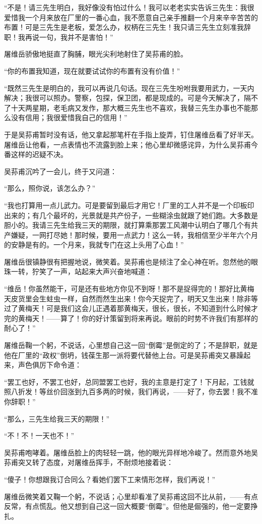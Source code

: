\par “不是！请三先生明白，我好像没有怕过什么！我可以老老实实告诉三先生：我很爱惜我一个月来放在厂里的一番心血，我不愿意自己亲手推翻一个月来辛辛苦苦的布置！可是三先生是老板，爱怎么办，权柄在三先生！我只请三先生立刻准我辞职！我再说一句，我并不是害怕！”
\par 屠维岳骄傲地挺直了胸脯，眼光尖利地射住了吴荪甫的脸。
\par “你的布置我知道，现在就要试试你的布置有没有价值！”
\par “既然三先生是明白的，我可以再说几句话。现在三先生吩咐我要用武力，一天内解决；我很可以照办。警察，包探，保卫团，都是现成的。可是今天解决了，隔不了十天两星期，老毛病又发作，那大概三先生也不喜欢，我替三先生办事也不能那么没有信用；我很爱惜我自己的信用！”
\par 于是吴荪甫暂时没有话，他又拿起那笔杆在手指上旋弄，钉住屠维岳看了好半天。屠维岳让他看，一点表情也不流露到脸上来；他心里却微感诧异，为什么吴荪甫今番这样的迟疑不决。
\par 吴荪甫沉吟了一会儿，终于又问道：
\par “那么，照你说，该怎么办？”
\par “我也打算用一点儿武力。可是要留到最后才用它！厂里的工人并不是一个印板印出来的；有几个最坏的，光景就是共产份子，一些糊涂虫就跟了她们跑。大多数是胆小的。我请三先生给我三天的期限，就打算乘那罢工风潮中认明白了哪几个有共产嫌疑，一网打尽她！那时候，要用一点武力！这么一转，我相信至少半年六个月的安静是有的。一个月来，我就专门在这上头用了心血！”
\par 屠维岳很镇静很有把握地说，微笑着。吴荪甫也是倾注了全心神在听。忽然他的眼珠一转，狞笑了一声，站起来大声兴奋地喊道：
\par “维岳！你虽然能干，可是还有些地方你见不到呀！那不是捉得完的！那好比黄梅天皮货里会生蛀虫一样，自然而然生出来！你今天捉完了，明天又生出来！除非等过了黄梅天！可是我们这会儿正遇着那黄梅天，很长，很长，不知道到什么时候才完的黄梅天！——算了！你的好计策留到将来再说。眼前的时势不许我们有那样的耐心了！”
\par 屠维岳鞠一个躬，不说话，心里想自己这一回“倒霉”是倒定的了；不是辞职，就是他在厂里的“政权”倒坍，钱葆生那一派将要代替他上台。可是吴荪甫突又暴躁起来，声色俱厉下命令道：
\par “罢工也好，不罢工也好，总同盟罢工也好，我的主意是打定了！下月起，工钱就照八折发！等丝价回涨到九百多两的时候，我们再说，——好了，你去罢！我不准你辞职！”
\par “那么，三先生给我三天的期限！”
\par “不！不！一天也不！”
\par 吴荪甫咆哮着。屠维岳脸上的肉轻轻一跳，他的眼光异样地冷峻了。然而意外地吴荪甫突又转了态度，对屠维岳挥手，不耐烦地接着说：
\par “傻子！你想跟我订合同么？看她们罢下工来情形怎样，我们再说！”
\par 屠维岳微笑着又鞠一个躬，不说话；心里却看准了吴荪甫这回不比从前，——有点反常，有点慌乱。他又想到自己这一回大概要“倒霉”。但他是倔强的，他一定要挣扎。

